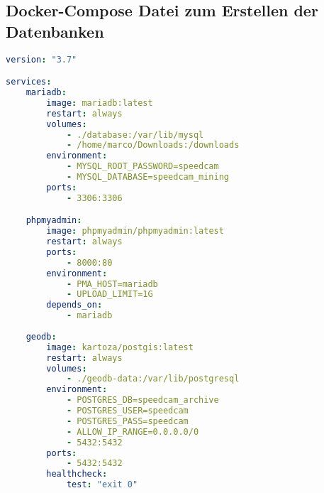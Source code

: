 \subsection{Docker-Compose Datei zum Erstellen der Datenbanken}
\label{sec:AnhangDockerCompose}

\begin{minipage}{\linewidth}
\begin{lstlisting}[language={YAML}, basicstyle=\footnotesize\ttfamily\linespread{1.3}, caption={Docker-Compose Datei mit MariaDB, PhpMyAdmin und PostGIS}, captionpos=b, label=lst:DockerComposeDBs]
version: "3.7"

services:
    mariadb:
        image: mariadb:latest
        restart: always
        volumes:
            - ./database:/var/lib/mysql
            - /home/marco/Downloads:/downloads
        environment:
            - MYSQL_ROOT_PASSWORD=speedcam
            - MYSQL_DATABASE=speedcam_mining
        ports:
            - 3306:3306

    phpmyadmin:
        image: phpmyadmin/phpmyadmin:latest
        restart: always
        ports:
            - 8000:80
        environment:
            - PMA_HOST=mariadb
            - UPLOAD_LIMIT=1G
        depends_on:
            - mariadb
    
    geodb:
        image: kartoza/postgis:latest
        restart: always
        volumes:
            - ./geodb-data:/var/lib/postgresql
        environment:
            - POSTGRES_DB=speedcam_archive
            - POSTGRES_USER=speedcam
            - POSTGRES_PASS=speedcam
            - ALLOW_IP_RANGE=0.0.0.0/0
            - 5432:5432
        ports:
            - 5432:5432
        healthcheck:
            test: "exit 0"
\end{lstlisting}
\end{minipage}